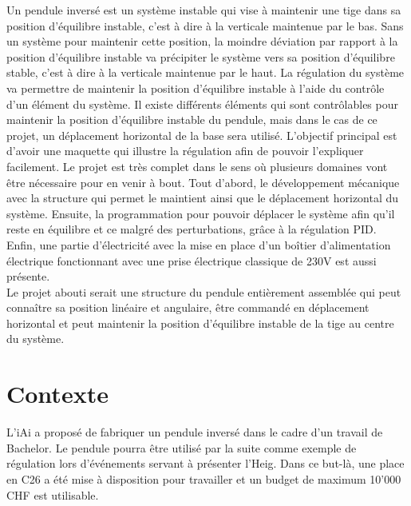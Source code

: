 Un pendule inversé est un système instable qui vise à maintenir une tige dans sa position d'équilibre instable, c'est à dire à la verticale
maintenue par le bas. Sans un système pour maintenir cette position, la moindre déviation par rapport à la position d'équilibre instable va
précipiter le système vers sa position d'équilibre stable, c'est à dire à la verticale maintenue par le haut. La régulation du système va
permettre de maintenir la position d'équilibre instable à l'aide du contrôle d'un élément du système. Il existe différents éléments qui sont
contrôlables pour maintenir la position d'équilibre instable du pendule, mais dans le cas de ce projet, un déplacement horizontal de la base
sera utilisé. L'objectif principal est d'avoir une maquette qui illustre la régulation afin de pouvoir l'expliquer facilement. Le projet est
très complet dans le sens où plusieurs domaines vont être nécessaire pour en venir à bout. Tout d'abord, le développement mécanique avec la structure
qui permet le maintient ainsi que le déplacement horizontal du système. Ensuite, la programmation pour pouvoir déplacer le système afin qu'il
reste en équilibre et ce malgré des perturbations, grâce à la régulation \gls{PID}. Enfin, une partie d'électricité avec la mise en place
d'un boîtier d'alimentation électrique fonctionnant avec une prise électrique classique de 230V est aussi présente.\\

Le projet abouti serait une structure du pendule entièrement assemblée qui peut connaître sa position linéaire et angulaire, être commandé
en déplacement horizontal et peut maintenir la position d'équilibre instable de la tige au centre du système.

\section{Contexte}
L'\acrlong{iAi} a proposé de fabriquer un pendule inversé dans le cadre d'un travail
de Bachelor. Le pendule pourra être utilisé par la suite comme exemple de régulation lors d'événements servant à présenter l'\acrshort{Heig}.
Dans ce but-là, une place en C26 a été mise à disposition pour travailler et un budget de maximum 10'000 CHF est utilisable.
